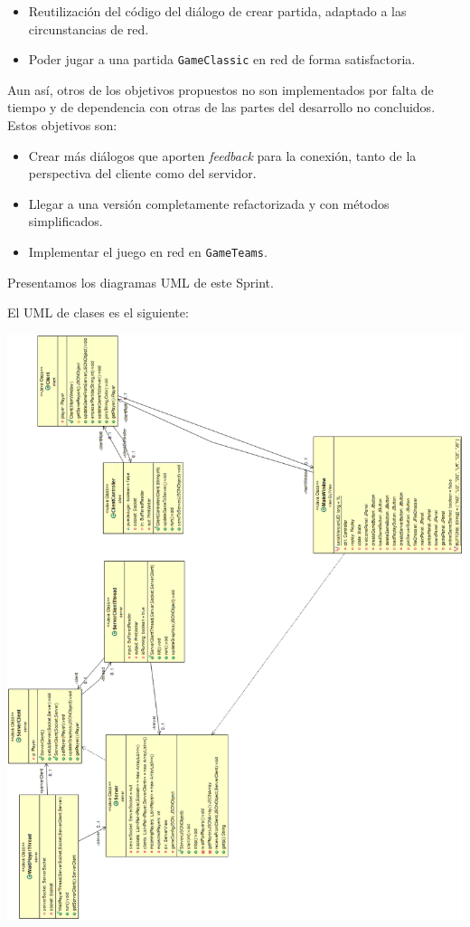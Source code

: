 \documentclass[../DocumentoOficial.tex]{subfiles}
\begin{document}
\begin{sprint}[5]
\begin{itemize}
\item Reutilización del código del diálogo de crear partida, adaptado a las circunstancias de red.

\item Poder jugar a una partida \texttt{GameClassic} en red de forma satisfactoria.

\end{itemize}

Aun así, otros de los objetivos propuestos no son implementados por falta de tiempo y de dependencia con otras de las partes del desarrollo no concluidos. Estos objetivos son:

\begin{itemize}
\item Crear más diálogos que aporten \textit{feedback} para la conexión, tanto de la perspectiva del cliente como del servidor.

\item Llegar a una versión completamente refactorizada y con métodos simplificados.

\item Implementar el juego en red en \texttt{GameTeams}.
\end{itemize}

Presentamos los diagramas UML de este Sprint.

El UML de clases es el siguiente:

\begin{center}
\includegraphics[scale=0.52]{UMLClasesRedSprint5.png} 
\end{center}


\end{sprint}
\end{document}
